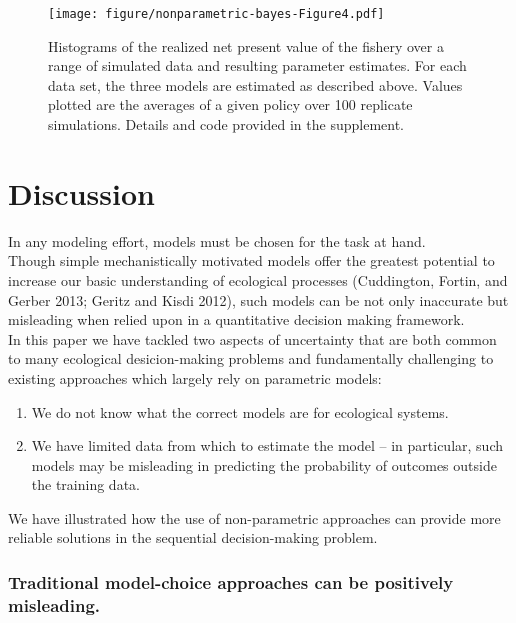 \documentclass[author-year, review]{elsarticle} %
\makeatletter
\def\maxwidth{\ifdim\Gin@nat@width>\linewidth\linewidth
\else\Gin@nat@width\fi}
\let\Oldincludegraphics\includegraphics
\renewcommand{\includegraphics}[1]{\Oldincludegraphics[width=\maxwidth]{#1}}
\makeatother
\begin{document}
\begin{figure}[htbp]
\centering
\texttt{[image: figure/nonparametric-bayes-Figure4.pdf]}
\caption{Histograms of the realized net present value of the fishery
over a range of simulated data and resulting parameter estimates. For
each data set, the three models are estimated as described above. Values
plotted are the averages of a given policy over 100 replicate
simulations. Details and code provided in the supplement.}
\end{figure}

\section{Discussion}\label{discussion}

In any modeling effort, models must be chosen for the task at
hand.\\Though simple mechanistically motivated models offer the greatest
potential to increase our basic understanding of ecological processes
(Cuddington, Fortin, and Gerber 2013; Geritz and Kisdi 2012), such
models can be not only inaccurate but misleading when relied upon in a
quantitative decision making framework.\\In this paper we have tackled
two aspects of uncertainty that are both common to many ecological
desicion-making problems and fundamentally challenging to existing
approaches which largely rely on parametric models:

\begin{enumerate}
\def\labelenumi{\arabic{enumi}.}
\itemsep1pt\parskip0pt
\item
  We do not know what the correct models are for ecological systems.
\item
  We have limited data from which to estimate the model -- in
  particular, such models may be misleading in predicting the
  probability of outcomes outside the training data.
\end{enumerate}

We have illustrated how the use of non-parametric approaches can provide
more reliable solutions in the sequential decision-making problem.

\subsubsection{Traditional model-choice approaches can be positively
misleading.}\label{traditional-model-choice-approaches-can-be-positively-misleading.}
\end{document}
